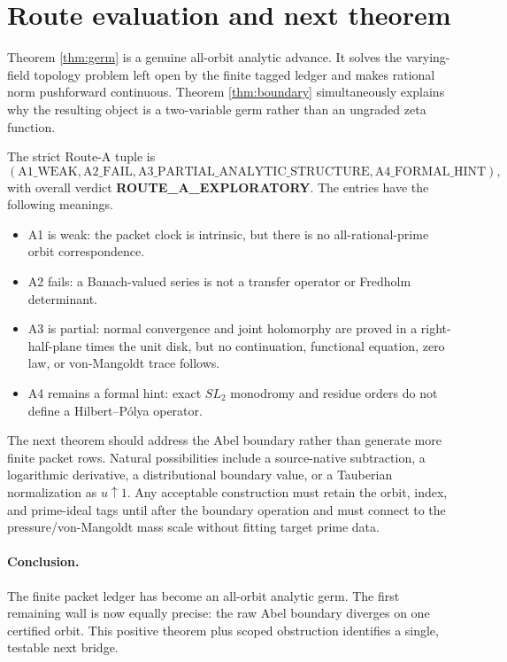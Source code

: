 \section{Route evaluation and next theorem}

Theorem \ref{thm:germ} is a genuine all-orbit analytic advance.  It solves
the varying-field topology problem left open by the finite tagged ledger and
makes rational norm pushforward continuous.  Theorem \ref{thm:boundary}
simultaneously explains why the resulting object is a two-variable germ
rather than an ungraded zeta function.

The strict Route-A tuple is
\[
(\mathrm{A1\_WEAK},\mathrm{A2\_FAIL},
\mathrm{A3\_PARTIAL\_ANALYTIC\_STRUCTURE},
\mathrm{A4\_FORMAL\_HINT}),
\]
with overall verdict \textbf{ROUTE\_A\_EXPLORATORY}.  The entries have the
following meanings.
\begin{itemize}
\item A1 is weak: the packet clock is intrinsic, but there is no
  all-rational-prime orbit correspondence.
\item A2 fails: a Banach-valued series is not a transfer operator or
  Fredholm determinant.
\item A3 is partial: normal convergence and joint holomorphy are proved in
  a right-half-plane times the unit disk, but no continuation, functional
  equation, zero law, or von-Mangoldt trace follows.
\item A4 remains a formal hint: exact $SL_2$ monodromy and residue orders do
  not define a Hilbert--P\'olya operator.
\end{itemize}

The next theorem should address the Abel boundary rather than generate more
finite packet rows.  Natural possibilities include a source-native
subtraction, a logarithmic derivative, a distributional boundary value, or
a Tauberian normalization as $u\uparrow1$.  Any acceptable construction
must retain the orbit, index, and prime-ideal tags until after the boundary
operation and must connect to the pressure/von-Mangoldt mass scale without
fitting target prime data.

\paragraph{Conclusion.}
The finite packet ledger has become an all-orbit analytic germ.  The first
remaining wall is now equally precise: the raw Abel boundary diverges on one
certified orbit.  This positive theorem plus scoped obstruction identifies a
single, testable next bridge.
